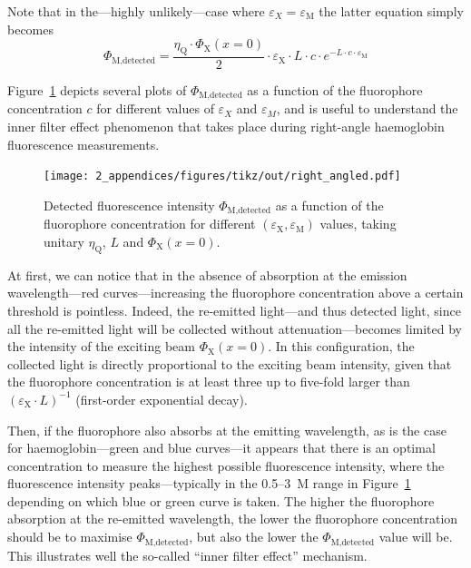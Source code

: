 Note that in the---highly unlikely---case where $\varepsilon_X = \varepsilon_\text{M}$ the latter equation simply becomes
\begin{equation}
	\Phi_\text{M,detected} = \frac{\eta_\text{Q} \cdot \Phi_\text{X}(x=0)}{2} \cdot \varepsilon_\text{X} \cdot L \cdot c \cdot e^{-L\cdot c \cdot \varepsilon_\text{M}}
\end{equation}


Figure~\ref{annfig:fluo_quenching:fluo_right_curves} depicts several plots of $\Phi_\text{M,detected}$ as a function of the fluorophore concentration $c$ for different values of $\varepsilon_X$ and $\varepsilon_M$, and is useful to understand the inner filter effect phenomenon that takes place during right-angle haemoglobin fluorescence measurements.

\begin{figure}
	\centering
	\texttt{[image: 2\_appendices/figures/tikz/out/right\_angled.pdf]}
	\caption[Detected fluorescence intensity in the right-angle optics case.]{Detected fluorescence intensity $\Phi_\text{M,detected}$ as a function of the fluorophore concentration for different $(\varepsilon_\text{X},\varepsilon_\text{M})$ values, taking unitary $\eta_\text{Q}$, $L$ and $\Phi_\text{X}(x=0)$.}
	\label{annfig:fluo_quenching:fluo_right_curves}
\end{figure}

At first, we can notice that in the absence of absorption at the emission wavelength---red curves---increasing the fluorophore concentration above a certain threshold is pointless. Indeed, the re-emitted light---and thus detected light, since all the re-emitted light will be collected without attenuation---becomes limited by the intensity of the exciting beam $\Phi_\text{X}(x=0)$. In this configuration, the collected light is directly proportional to the exciting beam intensity, given that the fluorophore concentration is at least three up to five-fold larger than $(\varepsilon_\text{X} \cdot L)^{-1}$ (first-order exponential decay).

Then, if the fluorophore also absorbs at the emitting wavelength, as is the case for haemo\-globin---green and blue curves---it appears that there is an optimal concentration to measure the highest possible fluorescence intensity, where the fluorescence intensity peaks---typically in the 0.5--3~M range in Figure~\ref{annfig:fluo_quenching:fluo_right_curves} depending on which blue or green curve is taken. The higher the fluorophore absorption at the re-emitted wavelength, the lower the fluorophore concentration should be to maximise $\Phi_\text{M,detected}$, but also the lower the $\Phi_\text{M,detected}$ value will be. This illustrates well the so-called \enquote{inner filter effect} mechanism.

